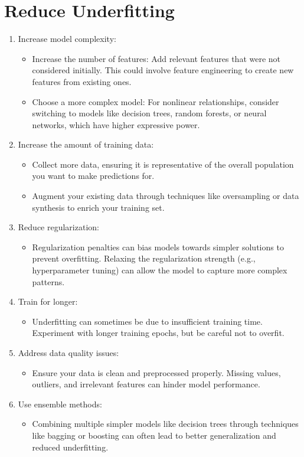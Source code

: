 \section{Reduce Underfitting}
    \begin{enumerate}
        \item Increase model complexity:
            \begin{itemize}
                \item Increase the number of features: Add relevant features that were not considered initially. This could involve feature engineering to create new features from existing ones.
                \item Choose a more complex model: For nonlinear relationships, consider switching to models like decision trees, random forests, or neural networks, which have higher expressive power.
            \end{itemize}

        \item Increase the amount of training data:
            \begin{itemize}
                \item Collect more data, ensuring it is representative of the overall population you want to make predictions for.
                \item Augment your existing data through techniques like oversampling or data synthesis to enrich your training set.
            \end{itemize}
        
        \item Reduce regularization:
            \begin{itemize}
                \item Regularization penalties can bias models towards simpler solutions to prevent overfitting. Relaxing the regularization strength (e.g., hyperparameter tuning) can allow the model to capture more complex patterns.
            \end{itemize}
        
        \item Train for longer:
            \begin{itemize}
                \item Underfitting can sometimes be due to insufficient training time. Experiment with longer training epochs, but be careful not to overfit.
            \end{itemize}
        
        \item Address data quality issues:
            \begin{itemize}
                \item Ensure your data is clean and preprocessed properly. Missing values, outliers, and irrelevant features can hinder model performance.
            \end{itemize}
        
        \item Use ensemble methods:
            \begin{itemize}
                \item Combining multiple simpler models like decision trees through techniques like bagging or boosting can often lead to better generalization and reduced underfitting.
            \end{itemize}
    \end{enumerate}